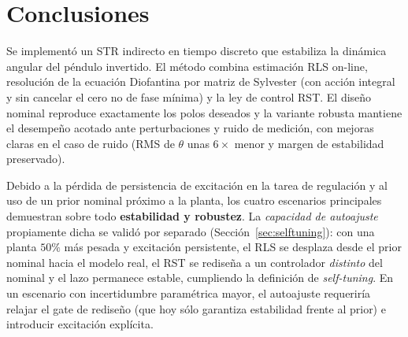 \documentclass[a4paper,11pt]{report}
\begin{document}
\section{Conclusiones}

Se implementó un STR indirecto en tiempo discreto que estabiliza la dinámica
angular del péndulo invertido. El método combina estimación RLS on-line,
resolución de la ecuación Diofantina por matriz de Sylvester (con acción integral
y sin cancelar el cero no de fase mínima) y la ley de control RST. El diseño
nominal reproduce exactamente los polos deseados y la variante robusta mantiene
el desempeño acotado ante perturbaciones y ruido de medición, con mejoras claras
en el caso de ruido (RMS de $\theta$ unas $6\times$ menor y margen de estabilidad
preservado).

Debido a la pérdida de persistencia de excitación en la tarea de regulación y al
uso de un prior nominal próximo a la planta, los cuatro escenarios principales
demuestran sobre todo \textbf{estabilidad y robustez}. La \emph{capacidad de
autoajuste} propiamente dicha se validó por separado (Sección~\ref{sec:selftuning}):
con una planta $50\%$ más pesada y excitación persistente, el RLS se desplaza
desde el prior nominal hacia el modelo real, el RST se rediseña a un controlador
\emph{distinto} del nominal y el lazo permanece estable, cumpliendo la definición
de \emph{self-tuning}. En un escenario con incertidumbre paramétrica mayor, el
autoajuste requeriría relajar el gate de rediseño (que hoy sólo garantiza
estabilidad frente al prior) e introducir excitación explícita.
\end{document}
